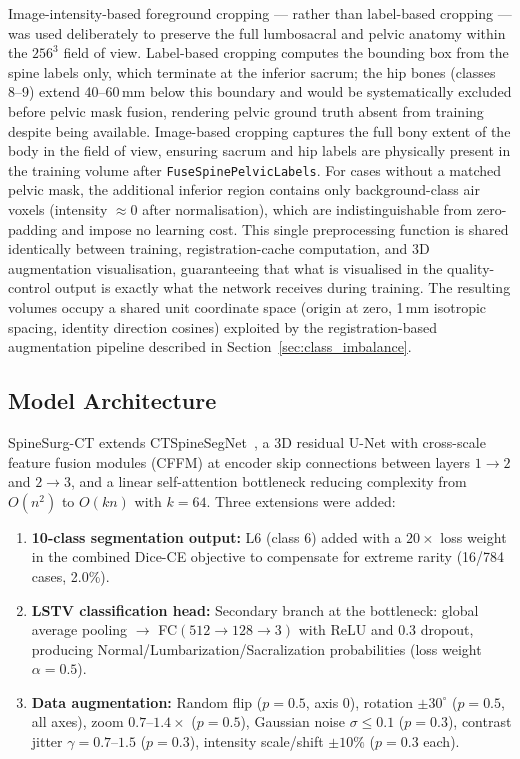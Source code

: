 \documentclass{article}
\begin{document}
Image-intensity-based foreground cropping --- rather than label-based cropping
--- was used deliberately to preserve the full lumbosacral and pelvic anatomy
within the $256^3$ field of view. Label-based cropping computes the bounding
box from the spine labels only, which terminate at the inferior sacrum; the hip
bones (classes 8--9) extend 40--60\,mm below this boundary and would be
systematically excluded before pelvic mask fusion, rendering pelvic ground
truth absent from training despite being available. Image-based cropping
captures the full bony extent of the body in the field of view, ensuring
sacrum and hip labels are physically present in the training volume after
\texttt{FuseSpinePelvicLabels}. For cases without a matched pelvic mask, the
additional inferior region contains only background-class air voxels (intensity
$\approx 0$ after normalisation), which are indistinguishable from zero-padding
and impose no learning cost. This single preprocessing function is shared
identically between training, registration-cache computation, and 3D
augmentation visualisation, guaranteeing that what is visualised in the
quality-control output is exactly what the network receives during training.
The resulting volumes occupy a shared unit coordinate space (origin at zero,
1\,mm isotropic spacing, identity direction cosines) exploited by the
registration-based augmentation pipeline described in
Section~\ref{sec:class_imbalance}.

\subsection{Model Architecture}

SpineSurg-CT extends CTSpineSegNet~\citep{li2025spinenet}, a 3D residual U-Net
with cross-scale feature fusion modules (CFFM) at encoder skip connections
between layers $1{\to}2$ and $2{\to}3$, and a linear self-attention bottleneck
reducing complexity from $O(n^2)$ to $O(kn)$ with $k{=}64$. Three extensions
were added:

\begin{enumerate}[noitemsep]
  \item \textbf{10-class segmentation output:} L6 (class 6) added with a
    $20\times$ loss weight in the combined Dice-CE objective to compensate for
    extreme rarity (16/784 cases, 2.0\%).
  \item \textbf{LSTV classification head:} Secondary branch at the bottleneck:
    global average pooling $\to$ FC$(512{\to}128{\to}3)$ with ReLU and 0.3
    dropout, producing Normal/Lumbarization/Sacralization probabilities
    (loss weight $\alpha{=}0.5$).
  \item \textbf{Data augmentation:} Random flip ($p{=}0.5$, axis 0), rotation
    $\pm30^{\circ}$ ($p{=}0.5$, all axes), zoom $0.7$--$1.4\times$ ($p{=}0.5$),
    Gaussian noise $\sigma{\le}0.1$ ($p{=}0.3$), contrast jitter
    $\gamma{=}0.7$--$1.5$ ($p{=}0.3$), intensity scale/shift $\pm10\%$
    ($p{=}0.3$ each).
\end{enumerate}
\end{document}
